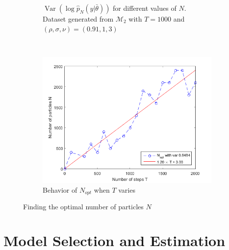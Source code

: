 \documentclass[11pt,a4,twosided,singlespacing,titlepagenumber=on]{scrreprt}
\numberwithin{equation}{chapter} %
\theoremstyle{remark}
\DeclareMathOperator{\var}{Var}
\begin{document}
\begin{figure}[H]
\begin{subfigure}[t]{0.49\textwidth}
        \caption{$\var(\log \hat{p}_N(y|\bar{\theta}))$ for different values of $N$. Dataset generated from $\mathcal{M}_2$ with $T=1000$ and $(\rho,\sigma,\nu) = (0.91,1,3)$}
        \label{est_var_pn_theta_n}
    \end{subfigure}\\
    \begin{subfigure}[t]{0.49\textwidth}
        \centering
        \includegraphics[width=1\textwidth]{n_opt_function_t}
        \caption{Behavior of $N_{opt}$ when $T$ varies}
        \label{n_opt_function_t}
    \end{subfigure}
    \caption{Finding the optimal number of particles $N$}
\end{figure}

\chapter{Model Selection and Estimation}

\end{document}
